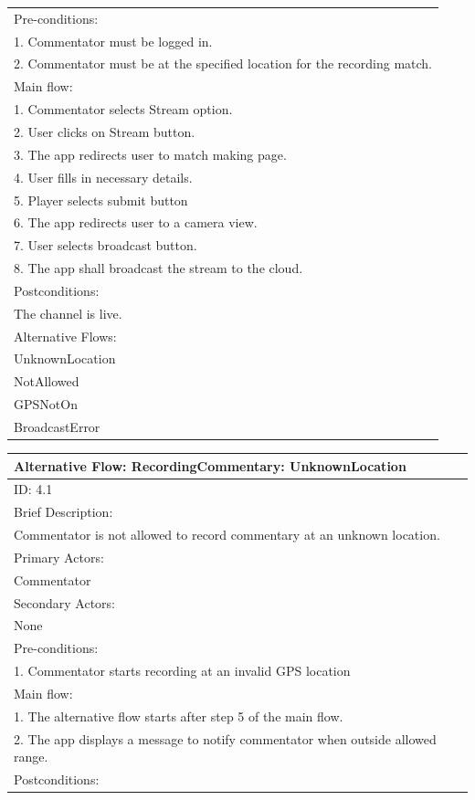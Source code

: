 \documentclass{article}
\begin{document}
\begin{flushleft}
\begin{longtable}[l]{|l|}
Pre-conditions:\\
1. Commentator must be logged in.\\
2. Commentator must be at the specified location for the recording match.\\
\hline
Main flow:\\
1. Commentator selects Stream option.\\
2. User clicks on Stream button.\\
3. The app redirects user to match making page.\\
4. User fills in necessary details.\\
5. Player selects submit button\\
6. The app redirects user to a camera view.\\
7. User selects broadcast button.\\
8. The app shall broadcast the stream to the cloud.\\
\hline
Postconditions:\\
The channel is live.\\
\hline
Alternative Flows:\\
UnknownLocation\\
NotAllowed\\
GPSNotOn\\
BroadcastError\\
\hline
\end{longtable}
\begin{longtable}[l]{|l|}
\hline
Alternative Flow: RecordingCommentary: UnknownLocation\\
\hline
ID: 4.1\\
\hline
Brief Description: \\
Commentator is not allowed to record commentary at an unknown location.\\
\hline
Primary Actors:\\
Commentator\\
\hline
Secondary Actors:\\
None\\
\hline
Pre-conditions:\\
1. Commentator starts recording at an invalid GPS location\\
\hline
Main flow:\\
1. The alternative flow starts after step 5 of the main flow.\\
2. The app displays a message to notify commentator when outside allowed range.\\
\hline
Postconditions:\\

\end{longtable}
\end{flushleft}
\end{document}
